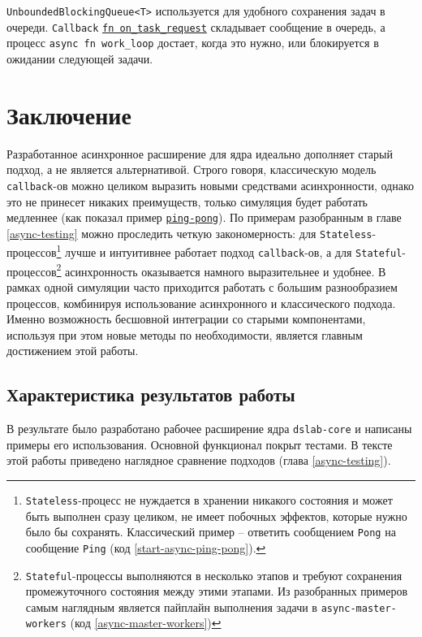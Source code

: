 \texttt{UnboundedBlockingQueue<T>} используется для удобного сохранения задач в очереди. \texttt{Сallback} \texttt{\underline{fn on\_task\_request}} складывает сообщение в очередь, а процесс \texttt{async fn work\_loop} достает, когда это нужно, или блокируется в ожидании следующей задачи.

\section{Заключение}

Разработанное асинхронное расширение для ядра идеально дополняет старый подход, а не является альтернативой. Строго говоря, классическую модель \texttt{callback}-ов можно целиком выразить новыми средствами асинхронности, однако это не принесет никаких преимуществ, только симуляция будет работать медленнее (как показал пример \hyperref[cmp:ping-pong]{\texttt{ping-pong}}). По примерам разобранным в главе \ref{async-testing} можно проследить четкую закономерность: для \texttt{Stateless}-процессов\footnote{
    \texttt{Stateless}-процесс не нуждается в хранении никакого состояния и может быть выполнен сразу целиком, не имеет побочных эффектов, которые нужно было бы сохранять. Классический пример -- ответить сообщением \texttt{Pong} на сообщение \texttt{Ping} (код \ref{start-async-ping-pong}). }
лучше и интуитивнее работает подход \texttt{callback}-ов, а для \texttt{Stateful}-процессов\footnote{
    \texttt{Stateful}-процессы выполняются в несколько этапов и требуют сохранения промежуточного состояния между этими этапами. Из разобранных примеров самым наглядным является пайплайн выполнения задачи в \texttt{async-master-workers} (код \ref{async-master-workers})} 
асинхронность оказывается намного выразительнее и удобнее. В рамках одной симуляции часто приходится работать с большим разнообразием процессов, комбинируя использование асинхронного и классического подхода. Именно возможность бесшовной интеграции со старыми компонентами, используя при этом новые методы по необходимости, является главным достижением этой работы.



\subsection{Характеристика результатов работы}

В результате было разработано рабочее расширение ядра \texttt{dslab-core}\cite{async-dslab-core} и написаны примеры его использования\cite{async-ping-pong-example}\cite{async-event-details-example}\cite{async-master-workers-example}. Основной функционал покрыт тестами. В тексте этой работы приведено наглядное сравнение подходов (глава \ref{async-testing}).

